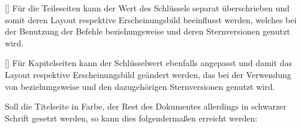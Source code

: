 \begin{Declaration}{[\PSet]}
\printdeclarationlist%
%
%
Für die Teileseiten kann der Wert des Schlüssels  separat 
überschrieben und somit deren Layout respektive Erscheinungsbild beeinflusst 
werden, welches bei der Benutzung der Befehle  beziehungsweise 
 und deren Sternversionen genutzt wird.
\end{Declaration}

\begin{Declaration}{[\PSet]}
\printdeclarationlist%
%
%
Für Kapitelseiten kann der Schlüsselwert  ebenfalls angepasst und 
damit das Layout respektive Erscheinungsbild geändert werden, das bei der 
Verwendung von  beziehungsweise  und den 
dazugehörigen Sternversionen genutzt wird.
\end{Declaration}
%
\begin{Example}
Soll die Titelseite in Farbe, der Rest des Dokumentes allerdings in schwarzer 
Schrift gesetzt werden, so kann dies folgendermaßen erreicht werden:
\end{Example}


